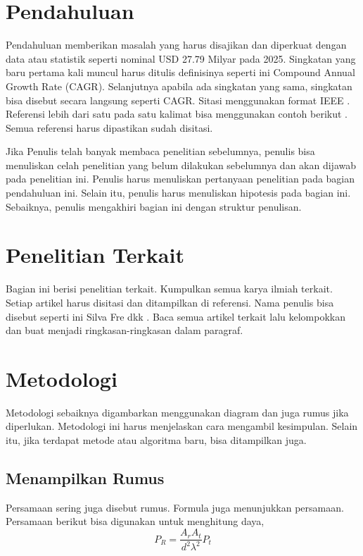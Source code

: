 \documentclass[metlit,article,accept,pdftex,moreauthors]{Definitions/mdpi}
\begin{document}
\section{Pendahuluan}
Pendahuluan memberikan masalah yang harus disajikan dan diperkuat dengan data atau statistik seperti nominal USD 27.79 Milyar pada 2025. Singkatan yang baru pertama kali muncul harus ditulis definisinya seperti ini Compound Annual Growth Rate (CAGR). Selanjutnya apabila ada singkatan yang sama, singkatan bisa disebut secara langsung seperti CAGR. Sitasi menggunakan format IEEE \cite{berita2024}. Referensi lebih dari satu pada satu kalimat bisa menggunakan contoh berikut \cite{Nuha2021,IndustrialWSN2023}. Semua referensi harus dipastikan sudah disitasi.

Jika Penulis telah banyak membaca penelitian sebelumnya, penulis bisa menuliskan celah penelitian yang belum dilakukan sebelumnya dan akan dijawab pada penelitian ini. Penulis harus menuliskan pertanyaan penelitian pada bagian pendahuluan ini. Selain itu, penulis harus menuliskan hipotesis pada bagian ini. Sebaiknya, penulis mengakhiri bagian ini dengan struktur penulisan.




\section{Penelitian Terkait}
Bagian ini berisi penelitian terkait. Kumpulkan semua karya ilmiah terkait. Setiap artikel harus disitasi dan ditampilkan di referensi. Nama penulis bisa disebut seperti ini Silva Fre dkk \cite{Silva2015}. Baca semua artikel terkait lalu kelompokkan dan buat menjadi ringkasan-ringkasan dalam paragraf.

\section{Metodologi}
Metodologi sebaiknya digambarkan menggunakan diagram dan juga rumus jika diperlukan. Metodologi ini harus menjelaskan cara mengambil kesimpulan. Selain itu, jika terdapat metode atau algoritma baru, bisa ditampilkan juga.

\subsection{Menampilkan Rumus}
Persamaan sering juga disebut rumus. Formula juga menunjukkan persamaan. Persamaan berikut bisa digunakan untuk menghitung daya,
\begin{equation}
\label{eq:friis}
P_R = \frac{A_r A_t}{d^2 \lambda^2} P_t    
\end{equation}
\end{document}
